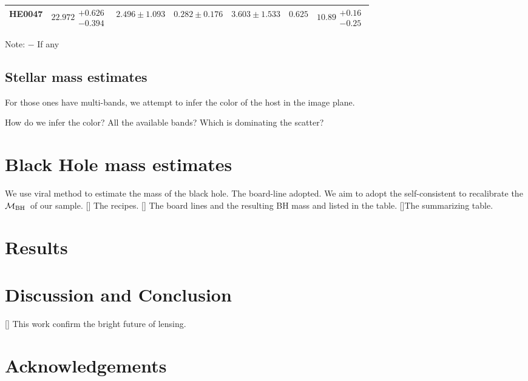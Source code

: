 \documentclass[fleqn,usenatbib]{mnras}
\newcommand{\mbh}{$\mathcal M_{\rm BH}$}
\newcommand{\ding}[1]{\textcolor{red}{[{\bf Xuheng}: #1]}}
\begin{document}
\begin{table}
\begin{threeparttable}
\begin{tabular}{ccccccc}
HE0047 & $22.972\substack{+0.626\\-0.394}$ & $2.496\pm1.093$ & $0.282\pm0.176$ & $3.603\pm1.533$ & $0.625$ & $10.89\substack{+0.16\\-0.25}$ \\
\hline
\end{tabular}
\begin{tablenotes}
      \small
      \item Note: $-$ If any
\end{tablenotes}    
\end{threeparttable}
\end{table}


\subsection{Stellar mass estimates}
For those ones have multi-bands, we attempt to infer the color of the host in the image plane.

How do we infer the color? All the available bands? Which is dominating the scatter?

\section{Black Hole mass estimates}
We use viral method to estimate the mass of the black hole. The board-line adopted. We aim to adopt the self-consistent to recalibrate the \mbh~of our sample. 
[] The recipes. [] The board lines and the resulting BH mass and listed in the table. []The summarizing table.

\section{Results}



\section{Discussion and Conclusion}
[] This work confirm the bright future of lensing.



\section*{Acknowledgements}
\end{document}
